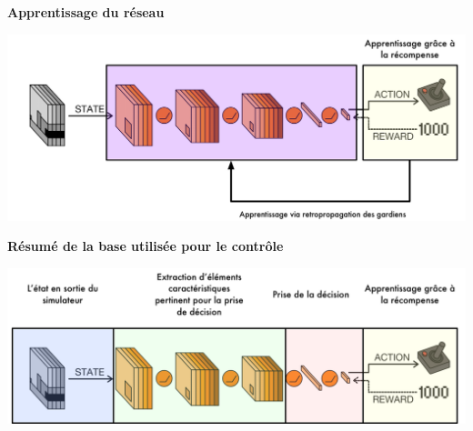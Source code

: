 \begin{frame}
    \textbf{Apprentissage du réseau}
\begin{center}
    \includegraphics[scale=.3]{./architecturevanilla/stage-3.png}
\end{center}
\end{frame}


\begin{frame}
    \textbf{Résumé de la base utilisée pour le contrôle}
\begin{center}
    \includegraphics[scale=.3]{./architecturevanilla/stage-4.png}
\end{center}
\end{frame}




